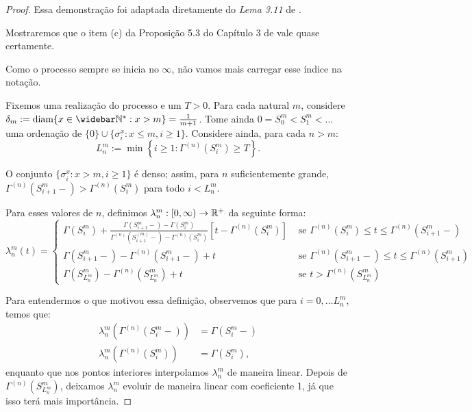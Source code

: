 \begin{proof}
  Essa demonstração foi adaptada diretamente do \emph{Lema 3.11} de
  \cite{fontes:08}.

  Mostraremos que o item (c) da Proposição 5.3 do Capítulo 3 de
  \cite{ethier:86} vale quase certamente.

  Como o processo sempre se inicia no $\infty$, não vamos mais
  carregar esse índice na notação.

  Fixemos uma realização do processo e um $T > 0$. Para cada natural
  $m$, considere $\delta_m := \diam\{ x \in \Nzb: x > m \} =
  \frac{1}{m+1}$. Tome ainda $0 = S_0^m < S_1^m < \ldots $ uma
  ordenação de $\{0\}\cup\{ \sigma^x_i : x \leq m, i \geq
  1\}$. Considere ainda, para cada $n > m$:
  \begin{displaymath}
    L^m_n := \min \left\{ i \geq 1: \Gamma^{(n)}(S^m_i) \geq T \right\}.
  \end{displaymath}

  O conjunto $\{\sigma_i^x: x > m, i\geq 1\}$ é denso; assim, para $n$
  suficientemente grande, $\Gamma^{(n)}(S^m_{i+1}-) >
  \Gamma^{(n)}(S^m_i)$ para todo $i < L^m_n$.

  Para esses valores de $n$, definimos $\lambda_n^m: [0, \infty) \to
  {\mathbb{R}}^+$ da seguinte forma:
  \begin{displaymath}
    \lambda_n^m(t) = \begin{cases}
      \Gamma(S_i^m) + \frac{\Gamma(S_{i+1}^m-) - \Gamma(S_i^m)}
      {\Gamma^{(n)}(S_{i+1}^{(m)} -) - \Gamma^{(n)}(S_i^m)}
      \left[t - \Gamma^{(n)}(S_i^m)\right]
      & \textrm{ se }
      \Gamma^{(n)}(S_i^m) \leq t \leq \Gamma^{(n)}(S_{i+1}^m-) \\
      \Gamma(S_{i+1}^m-) - \Gamma^{(n)}(S_{i+1}^m-) + t
      & \textrm{ se }
      \Gamma^{(n)}(S_{i+1}^m-) \leq t \leq \Gamma^{(n)}(S_{i+1}^m)\\
      \Gamma(S^m_{L_n^m}) - \Gamma^{(n)}(S^m_{L_n^m}) + t
      & \textrm{ se } t > \Gamma^{(n)}(S^m_{L_n^m})
    \end{cases}
  \end{displaymath}

  Para entendermos o que motivou essa definição, observemos que para $i =
  0, \ldots L_n^m$, temos que:
  \begin{align*}
    \lambda_n^m(\Gamma^{(n)}(S_i^m-)) &= \Gamma(S_i^m-)\\
    \lambda_n^m(\Gamma^{(n)}(S_i^m)) &= \Gamma(S_i^m),
  \end{align*}
  enquanto que nos pontos interiores interpolamos $\lambda_n^m$ de
  maneira linear. Depois de $\Gamma^{(n)}(S^m_{L_n^m})$, deixamos
  $\lambda_n^m$ evoluir de maneira linear com coeficiente 1, já que
  isso terá mais importância.


\end{proof}

